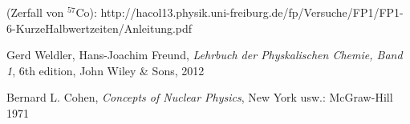 \documentclass[12pt]{article}
\begin{document}

\newpage
\listoffigures


\newpage
\thispagestyle{empty}
\begin{thebibliography}{9}

 (Zerfall von $^{57}$Co): http://hacol13.physik.uni-freiburg.de/fp/Versuche/FP1/FP1-6-KurzeHalbwertzeiten/Anleitung.pdf
  
	Gerd Weldler, Hans-Joachim Freund,
	\emph{Lehrbuch der Physkalischen Chemie, Band 1},
	6th edition,
	John Wiley \& Sons,
	2012

Bernard L. Cohen,
\emph{Concepts of Nuclear Physics},
 New York usw.: McGraw-Hill 1971
  
  

\end{thebibliography}
\end{document}
